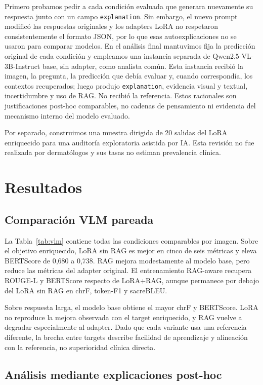 \documentclass[11pt]{article}
\begin{document}
Primero probamos pedir a cada condición evaluada que generara nuevamente su respuesta junto con un campo \texttt{explanation}. Sin embargo, el nuevo prompt modificó las respuestas originales y los adapters LoRA no respetaron consistentemente el formato JSON, por lo que esas autoexplicaciones no se usaron para comparar modelos. En el análisis final mantuvimos fija la predicción original de cada condición y empleamos una instancia separada de Qwen2.5-VL-3B-Instruct base, sin adapter, como analista común. Esta instancia recibió la imagen, la pregunta, la predicción que debía evaluar y, cuando correspondía, los contextos recuperados; luego produjo \texttt{explanation}, evidencia visual y textual, incertidumbre y uso de RAG. No recibió la referencia. Estos racionales son justificaciones post-hoc comparables, no cadenas de pensamiento ni evidencia del mecanismo interno del modelo evaluado.

Por separado, construimos una muestra dirigida de 20 salidas del LoRA enriquecido para una auditoría exploratoria asistida por IA. Esta revisión no fue realizada por dermatólogos y sus tasas no estiman prevalencia clínica.

\section{Resultados}

\subsection{Comparación VLM pareada}

La Tabla~\ref{tab:vlm} contiene todas las condiciones comparables por imagen. Sobre el objetivo enriquecido, LoRA sin RAG es mejor en cinco de seis métricas y eleva BERTScore de 0,680 a 0,738. RAG mejora modestamente al modelo base, pero reduce las métricas del adapter original. El entrenamiento RAG-aware recupera ROUGE-L y BERTScore respecto de LoRA+RAG, aunque permanece por debajo del LoRA sin RAG en chrF, token-F1 y sacreBLEU.

Sobre respuesta larga, el modelo base obtiene el mayor chrF y BERTScore. LoRA no reproduce la mejora observada con el target enriquecido, y RAG vuelve a degradar especialmente al adapter. Dado que cada variante usa una referencia diferente, la brecha entre targets describe facilidad de aprendizaje y alineación con la referencia, no superioridad clínica directa.

\subsection{Análisis mediante explicaciones post-hoc}
\end{document}
